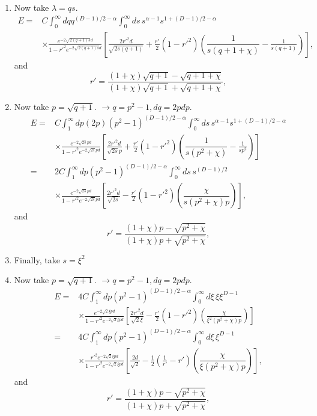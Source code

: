 \begin{enumerate}
\item Now take $\lambda = qs$.  
 \begin{align}
E=&  C\int_0^\infty dq q^{(D-1)/2-\alpha}\int_0^\infty ds\, s^{\alpha-1}s^{1+(D-1)/2-\alpha}\nonumber\\
&\times  \frac{e^{-2\sqrt{2(q+1)s}d}}{1-r'^2e^{-2\sqrt{2(q+1)s}d}}\left[\frac{2r'^2d}{\sqrt{2s(q+1)}}+ \frac{r'}{2}(1-r'^2)\left(\dfrac{1}{s(q+1+\chi)}  -\frac{1}{s(q+1)}\right)\right],
\end{align}
and 
\begin{equation}
r' =  \frac{(1+\chi)\sqrt{q+1}-\sqrt{q+ 1 + \chi}}{(1+\chi)\sqrt{q+1}+\sqrt{q+1+\chi}},
\end{equation}
\item Now take $p = \sqrt{q+1}$.  $\rightarrow  q = p^2-1, dq = 2p dp$.  
 \begin{align}
E=&  C\int_1^\infty dp(2p) (p^2-1)^{(D-1)/2-\alpha}\int_0^\infty ds\, s^{\alpha-1}s^{1+(D-1)/2-\alpha}\nonumber\\
&\times  \frac{e^{-2\sqrt{2s}pd}}{1-r'^2e^{-2\sqrt{2s}pd}}\left[\frac{2r'^2d}{\sqrt{2s}p}+ \frac{r'}{2}(1-r'^2)\left(\dfrac{1}{s(p^2+\chi)}  -\frac{1}{s p^2}\right)\right]\\
=&  2C\int_1^\infty dp (p^2-1)^{(D-1)/2-\alpha}\int_0^\infty ds\, s^{(D-1)/2}\nonumber\\
&\times\frac{e^{-2\sqrt{2s}pd}}{1-r'^2e^{-2\sqrt{2s}pd}}\left[\frac{2r'^2d}{\sqrt{2s}}- \frac{r'}{2}(1-r'^2)\left(\dfrac{\chi}{s(p^2+\chi)p}\right)\right],
\end{align}
and 
\begin{equation}
r' =  \frac{(1+\chi)p-\sqrt{p^2 + \chi}}{(1+\chi)p+\sqrt{p^2+\chi}},
\end{equation}
\item Finally, take 
$s = \xi^2$
\item Now take $p = \sqrt{q+1}$.  $\rightarrow  q = p^2-1, dq = 2p dp$.  
 \begin{align}
E=&  4C\int_1^\infty dp (p^2-1)^{(D-1)/2-\alpha}\int_0^\infty d\xi\,\xi\xi^{D-1}\nonumber\\
&\times  \frac{e^{-2\sqrt{2}\xi pd}}{1-r'^2e^{-2\sqrt{2}\xi pd}}\left[\frac{2r'^2d}{\sqrt{2}\xi}- \frac{r'}{2}(1-r'^2)\left(\frac{ \chi}{\xi^2(p^2+\chi)p}\right)\right]\\
=&  4C\int_1^\infty dp (p^2-1)^{(D-1)/2-\alpha}\int_0^\infty d\xi\,\xi^{D-1}\nonumber\\
&\times  \frac{r'^2e^{-2\sqrt{2}\xi pd}}{1-r'^2e^{-2\sqrt{2}\xi pd}}\left[\frac{2d}{\sqrt{2}}- \frac{1}{2}\left(\frac{1}{r'}-r'\right)\left(\dfrac{\chi}{\xi(p^2+\chi)p}\right)\right],
\end{align}
and 
\begin{equation}
r' =  \frac{(1+\chi)p-\sqrt{p^2 + \chi}}{(1+ \chi)p+\sqrt{p^2+\chi}},
\end{equation}


\end{enumerate}
